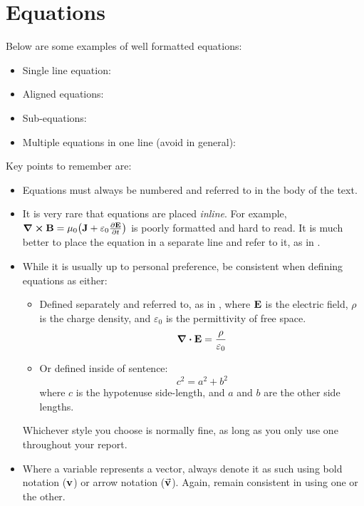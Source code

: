 \documentclass[draft,article]{UsydReport}
\begin{document}
\section{Equations}
Below are some examples of well formatted equations:
\begin{itemize}
    \item Single line equation: 
    \item Aligned equations: 
    \item Sub-equations: 
    \item Multiple equations in one line (avoid in general): 
\end{itemize}
Key points to remember are:
\begin{itemize}
    \item Equations must always be numbered and referred to in the body of the text.
    \item It is very rare that equations are placed \textit{inline}. For example, $\curl{\vb{B}} = \mu_0\qty(\vb{J} + \varepsilon_0 \pdv{\vb{E}}{t})$ is poorly formatted and hard to read. It is much better to place the equation in a separate line and refer to it, as in .
    \item While it is usually up to personal preference, be consistent when defining equations as either:
    \begin{itemize}
        \item Defined separately and referred to, as in , where $\vb{E}$ is the electric field, $\rho$ is the charge density, and $\varepsilon_0$ is the permittivity of free space.
        \begin{equation}\label{eq:Refer}
            \div{\vb{E}} = \frac{\rho}{\varepsilon_0}
        \end{equation}
        \item Or defined inside of sentence:
            \begin{equation}
                c^2 = a^2 + b^2
            \end{equation}
        where $c$ is the hypotenuse side-length, and $a$ and $b$ are the other side lengths.
    \end{itemize}
    Whichever style you choose is normally fine, as long as you only use one throughout your report.
    \item Where a variable represents a vector, always denote it as such using bold notation ($\vb{v}$) or arrow notation ($\va{v}$). Again, remain consistent in using one or the other.
\end{itemize}
\end{document}
